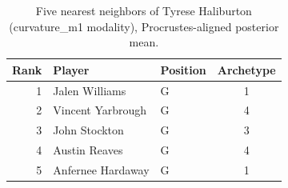 \begin{table}[htbp]
  \centering\small
  \begin{tabular}{rllc}
    \toprule
    Rank & Player & Position & Archetype \\
    \midrule
    1 & Jalen Williams & G & 1 \\
    2 & Vincent Yarbrough & G & 4 \\
    3 & John Stockton & G & 3 \\
    4 & Austin Reaves & G & 4 \\
    5 & Anfernee Hardaway & G & 1 \\
    \bottomrule
  \end{tabular}
  \caption{Five nearest neighbors of Tyrese Haliburton (curvature_m1 modality), Procrustes-aligned posterior mean.}
  \label{tab:Tyrese_Haliburton_neighbors_curvature_m1}
\end{table}

